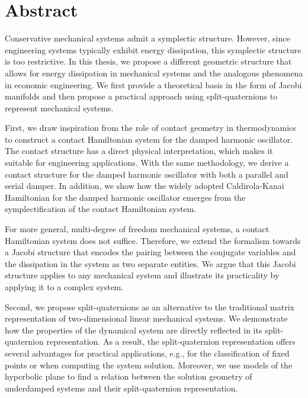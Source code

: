 \chapter*{Abstract}%

Conservative mechanical systems admit a symplectic structure. However, since engineering systems typically exhibit energy dissipation, this symplectic structure is too restrictive. In this thesis, we propose a different geometric structure that allows for energy dissipation in mechanical systems and the analogous phenomena in economic engineering. We first provide a theoretical basis in the form of Jacobi manifolds and then propose a practical approach using split-quaternions to represent mechanical systems.

First, we draw inspiration from the role of contact geometry in thermodynamics to construct a contact Hamiltonian system for the damped harmonic oscillator. The contact structure has a direct physical interpretation, which makes it suitable for engineering applications. With the same methodology, we derive a contact structure for the damped harmonic oscillator with both a parallel and serial damper. In addition, we show how the widely adopted Caldirola-Kanai Hamiltonian for the damped harmonic oscillator emerges from the symplectification of the contact Hamiltonian system. 

For more general, multi-degree of freedom mechanical systems, a contact Hamiltonian system does not suffice. Therefore, we extend the formalism towards a Jacobi structure that encodes the pairing between the conjugate variables and the dissipation in the system as two separate entities. We argue that this Jacobi structure applies to any mechanical system and illustrate its practicality by applying it to a complex system.

Second, we propose split-quaternions as an alternative to the traditional matrix representation of two-dimensional linear mechanical systems. We demonstrate how the properties of the dynamical system are directly reflected in its split-quaternion representation. As a result, the split-quaternion representation offers several advantages for practical applications, e.g., for the classification of fixed points or when computing the system solution. Moreover, we use models of the hyperbolic plane to find a relation between the solution geometry of underdamped systems and their split-quaternion representation.
 
 
